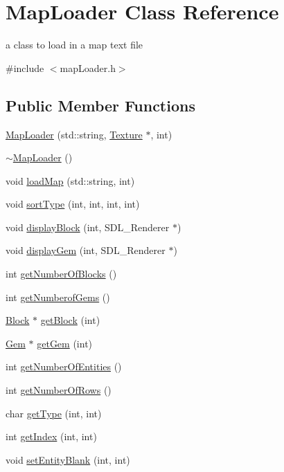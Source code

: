 \hypertarget{class_map_loader}{\section{Map\+Loader Class Reference}
\label{class_map_loader}
}


a class to load in a map text file  




{\ttfamily \#include $<$map\+Loader.\+h$>$}

\subsection*{Public Member Functions}
\begin{DoxyCompactItemize}
\item 
\hyperlink{class_map_loader_a759260eb5a2bcc71f4eb6e03e8d8dead}{Map\+Loader} (std\+::string, \hyperlink{class_texture}{Texture} $\ast$, int)
\item 
\hyperlink{class_map_loader_a6055310649b9a926301d7fb2b83cb1b1}{$\sim$\+Map\+Loader} ()
\item 
void \hyperlink{class_map_loader_aa3f95e47879ef5d2ac8f9b4e80602412}{load\+Map} (std\+::string, int)
\item 
void \hyperlink{class_map_loader_a5d094d7c804670f68e04c360cb9b5965}{sort\+Type} (int, int, int, int)
\item 
void \hyperlink{class_map_loader_a0430f4acdbe19fd6853a61e3b9f71543}{display\+Block} (int, S\+D\+L\+\_\+\+Renderer $\ast$)
\item 
void \hyperlink{class_map_loader_adf524d17cab14e1096341100abfe92b2}{display\+Gem} (int, S\+D\+L\+\_\+\+Renderer $\ast$)
\item 
int \hyperlink{class_map_loader_a178ca855ceec126f0a3a2264b74f63cc}{get\+Number\+Of\+Blocks} ()
\item 
int \hyperlink{class_map_loader_a026a7c38e03cdee9a355b09ca6048daa}{get\+Numberof\+Gems} ()
\item 
\hyperlink{class_block}{Block} $\ast$ \hyperlink{class_map_loader_a161a0cc6a392abc9baa57e919023f25c}{get\+Block} (int)
\item 
\hyperlink{class_gem}{Gem} $\ast$ \hyperlink{class_map_loader_a9b56fda5f4c27614131b085b449fe183}{get\+Gem} (int)
\item 
int \hyperlink{class_map_loader_afb4ddc89be3ef11cf55cedd91796981c}{get\+Number\+Of\+Entities} ()
\item 
int \hyperlink{class_map_loader_ae5e282def1789a5f4701c44379b67813}{get\+Number\+Of\+Rows} ()
\item 
char \hyperlink{class_map_loader_a8e20a9a3c99f4d86d8db873b4a293352}{get\+Type} (int, int)
\item 
int \hyperlink{class_map_loader_a91978c6df4df7c8805ff7b959f2f8f02}{get\+Index} (int, int)
\item 
void \hyperlink{class_map_loader_a29c10edfe06895dd0e0f04275d96e5ed}{set\+Entity\+Blank} (int, int)
\end{DoxyCompactItemize}


